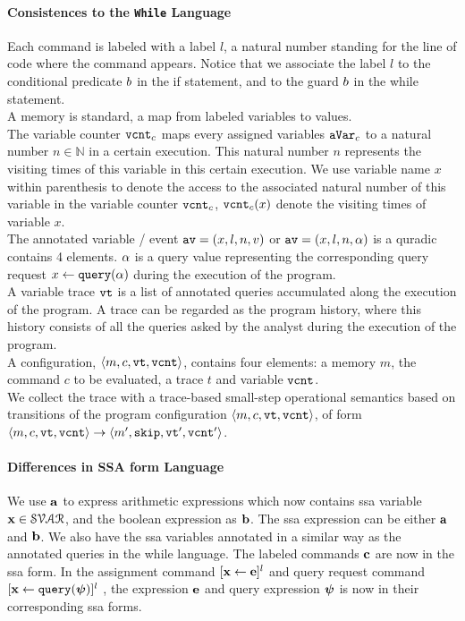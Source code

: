 \paragraph{Consistences to the {\tt While} Language}
Each command is labeled with a label $l$, a natural number standing for the line of code where the command appears. Notice that we associate the label $l$ to the conditional predicate $b$ in the if statement, and to the guard $b$ in the while statement. 
\\
A memory is standard, a map from labeled variables to values. 
%
\\
%
The variable counter $\mathtt{vcnt}_{c}$ maps every assigned variables $\mathtt{aVar}_{c}$ to a natural number $n \in \mathbb{N}$ in a certain execution. This natural number $n$ represents the visiting times of this variable in this certain execution.
%
We use variable name $x$ within parenthesis to denote the access to the associated natural number of this variable in the variable counter $\mathtt{vcnt}_{c}$, 
$\mathtt{vcnt}_{c}(x)$ denote the visiting times of variable $x$.
%
\\
The annotated variable / event $\mathtt{av} = (x, l, n, v) $ or $\mathtt{av} = (x, l, n, \alpha) $  is a quradic contains 4 elements. 
$\alpha$ is a query value representing the corresponding query request $\mathrel{ x \leftarrow {\tt query}(\alpha) }$ during the execution of the program.
%
\\
A variable trace $\mathtt{vt}$ is a list of annotated queries accumulated along the execution of the program. 
A trace can be regarded as the program history, where this history consists of all the queries asked by the analyst during the execution of the program. 
%
\\
A configuration, $\langle m, c, \mathtt{vt}, \mathtt{vcnt} \rangle$, contains four elements: a memory $m$, the command $c$ to be evaluated, a trace $t$ and variable $\mathtt{vcnt}$. 
%
\\
We collect the trace with a trace-based small-step operational semantics based on transitions of the program configuration $\langle m, c, \mathtt{vt}, \mathtt{vcnt} \rangle$,
of form $ \langle m,c, \mathtt{vt}, \mathtt{vcnt} \rangle \to \langle m', \mathtt{skip}, \mathtt{vt}', \mathtt{vcnt}' \rangle $. 
%
\\
%
\paragraph{Differences in SSA form Language}
We use ${\boldsymbol{\mathbf{a}}}$ to express arithmetic expressions which now contains ssa variable ${\boldsymbol{\mathbf{x}}} \in \mathcal{SVAR}$, 
and the boolean expression as ${\boldsymbol{\mathbf{b}}}$. 
%
The ssa expression can be either ${\boldsymbol{\mathbf{a}}}$ and ${\boldsymbol{\mathbf{b}}}$. 
We also have the ssa variables annotated in a similar way as the annotated queries in the while language.
%
The labeled commands ${\boldsymbol{\mathbf{c}}}$ are now in the ssa form. 
In the assignment command $[\mathrel{ {\boldsymbol{\mathbf{x}}} \leftarrow  {\boldsymbol{\mathbf{e}}} }]^{l}$ and query request command 
$[\mathrel{ {{\boldsymbol{\mathbf{x}}}}  \leftarrow {\tt query}({{\boldsymbol{\mathbf{\psi}}}}) }]^{l}$ , 
the expression ${{\boldsymbol{\mathbf{e}}}}$ and query expression 
${\boldsymbol{\mathbf{\psi}}}$ is now in their corresponding ssa forms. 

